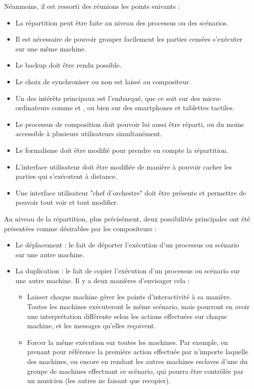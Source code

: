 Néanmoins, il est ressorti des réunions les points suivants : 
\begin{itemize}
	\item La répartition peut être faite au niveau des processus ou des scénarios.
	\item Il est nécessaire de pouvoir grouper facilement les parties censées s'exécuter sur une même machine.
	\item Le backup doit être rendu possible.
	\item Le choix de synchroniser ou non est laissé au compositeur.
	\item Un des intérêts principaux est l'embarqué, que ce soit sur des micro-ordinateurs comme  et , ou bien sur des smartphones et tablettes tactiles.
	\item Le processus de composition doit pouvoir lui aussi être réparti, ou du moins accessible à plusieurs utilisateurs simultanément.
	\item Le formalisme doit être modifié pour prendre en compte la répartition.
	\item L'interface utilisateur doit être modifiée de manière à pouvoir cacher les parties qui s'exécutent à distance.
	\item Une interface utilisateur "chef d'orchestre" doit être présente et permettre de pouvoir tout voir et tout modifier.
\end{itemize}

Au niveau de la répartition, plus précisément, deux possibilités principales ont été présentées comme désirables par les compositeurs : 
\begin{itemize}
	\item Le déplacement : le fait de déporter l'exécution d'un processus ou scénario sur une autre machine.
	\item La duplication : le fait de copier l'exécution d'un processus ou scénario sur une autre machine.
	Il y a deux manières d'envisager cela : 
	\begin{itemize}
		\item Laisser chaque machine gérer les points d'interactivité à sa manière. Toutes les machines exécuteront le même scénario, mais pourront en avoir une interprétation différente selon les actions effectuées sur chaque machine, et les messages qu'elles reçoivent.
		\item Forcer la même exécution sur toutes les machines. Par exemple, en prenant pour référence la première action effectuée par n'importe laquelle des machines, ou encore en rendant les autres machines esclaves d'une du groupe de machines effectuant ce scénario, qui pourra être contrôlée par un musicien (les autres ne faisant que recopier).
	\end{itemize}
\end{itemize}

